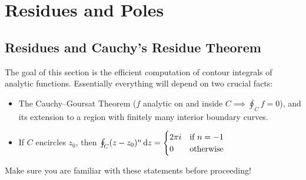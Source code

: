 \graphicspath{{6residues/asy/}}
\thispagestyle{empty}


\section{Residues and Poles}

\subsection{Residues and Cauchy's Residue Theorem}

The goal of this section is the efficient computation of contour integrals of analytic functions. Essentially everything will depend on two crucial facts:
\begin{itemize}
  \item The Cauchy--Goursat Theorem ($f$ analytic on and inside $C\implies \oint_Cf=0$), and its extension to a region with finitely many interior boundary curves.
  \item If $C$ encircles $z_0$, then $\oint_C(z-z_0)^n\,{\mathrm{d} z}=\begin{cases}
  2\pi i&\text{if $n=-1$}\\
  0&\text{otherwise}
  \end{cases}$
\end{itemize}
Make sure you are familiar with these statements before proceeding!


